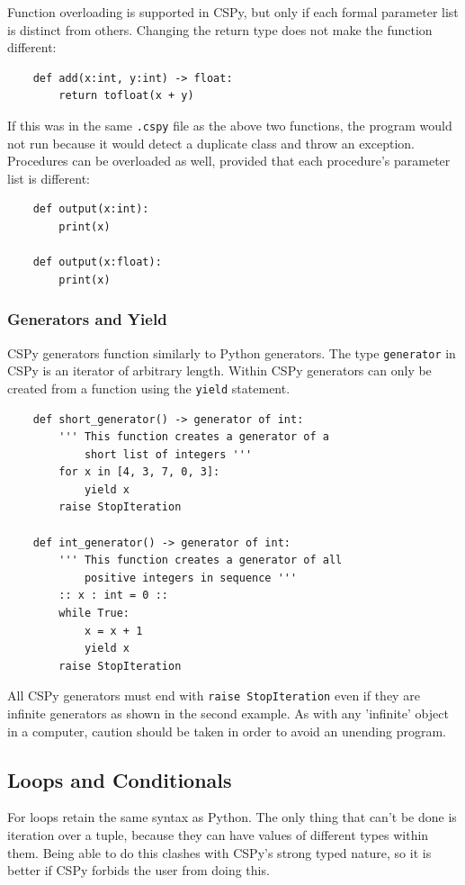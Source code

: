 \documentclass{article}
\begin{document}
Function overloading is supported in CSPy, but only if each formal parameter list is distinct from others. Changing the return type does not make the function different:
\begin{verbatim}
    def add(x:int, y:int) -> float:
        return tofloat(x + y)
\end{verbatim}
If this was in the same \verb|.cspy| file as the above two functions, the program would not run because it would detect a duplicate class and throw an exception.\\

Procedures can be overloaded as well, provided that each procedure's parameter list is different:
\begin{verbatim}
    def output(x:int):
        print(x)

    def output(x:float):
        print(x)
\end{verbatim}

\subsubsection{Generators and Yield} \label{generators_and_yield}
CSPy generators function similarly to Python generators. The type \verb|generator| in CSPy is an iterator of arbitrary length. Within CSPy generators can only be created from a function using the \verb|yield| statement.
\begin{verbatim}
    def short_generator() -> generator of int:
        ''' This function creates a generator of a
            short list of integers '''
        for x in [4, 3, 7, 0, 3]:
            yield x
        raise StopIteration

    def int_generator() -> generator of int:
        ''' This function creates a generator of all
            positive integers in sequence '''
        :: x : int = 0 ::
        while True:
            x = x + 1
            yield x
        raise StopIteration
\end{verbatim}
All CSPy generators must end with \verb|raise StopIteration| even if they are infinite generators as shown in the second example. As with any 'infinite' object in a computer, caution should be taken in order to avoid an unending program.

\subsection{Loops and Conditionals}
For loops retain the same syntax as Python. The only thing that can't be done is iteration over a tuple, because they can have values of different types within them. Being able to do this clashes with CSPy's strong typed nature, so it is better if CSPy forbids the user from doing this.
\end{document}
